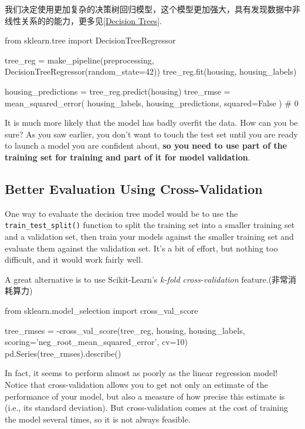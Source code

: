 我们决定使用更加复杂的决策树回归模型，这个模型更加强大，具有发现数据中非线性关系的的能力，更多见\autoref{Decision Trees}.

\begin{pyc}
from sklearn.tree import DecisionTreeRegressor

tree_reg = make_pipeline(preprocessing, DecisionTreeRegressor(random_state=42))
tree_reg.fit(housing, housing_labels)

housing_predictions = tree_reg.predict(housing)
tree_rmse = mean_squared_error(
    housing_labels,
    housing_predictions,
    squared=False
)
# 0
\end{pyc}
It is much more likely that the model has badly overfit the data. How can you be sure?
As you saw earlier, you don’t want to touch the test set until you are ready to launch a
model you are confident about, \textbf{so you need to use part of the training set for training
and part of it for model validation}.

\subsection{Better Evaluation Using Cross-Validation}
One way to evaluate the decision tree model would be to use the \verb|train_test_split()| function to split the training set into a smaller training set and a validation set, then train your models against the smaller training set and evaluate
them against the validation set. It’s a bit of effort, but nothing too difficult, and it
would work fairly well.

A great alternative is to use Scikit-Learn’s \emph{k-fold cross-validation} feature.(非常消耗算力)
\begin{pyc}
from sklearn.model_selection import cross_val_score

tree_rmses = -cross_val_score(tree_reg, housing, housing_labels,
                              scoring='neg_root_mean_squared_error',
                              cv=10)
pd.Series(tree_rmses).describe()
\end{pyc}

In fact, it seems to perform almost as poorly as the linear regression model! Notice that cross-validation allows you to get not only an estimate of the performance of your model, but also a measure of how precise this estimate is (i.e., its standard deviation). But cross-validation comes at the cost of training the model several times, so it is not always feasible.

